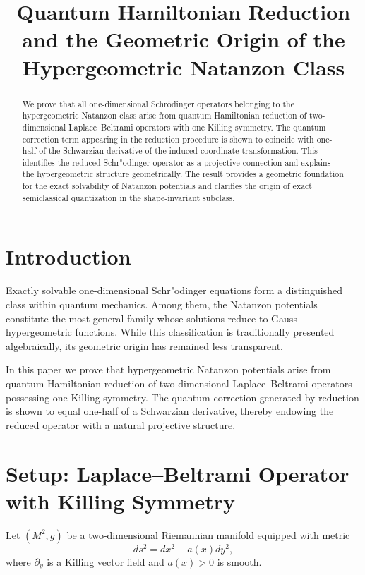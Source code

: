 \documentclass[11pt]{article}
\title{ Quantum Hamiltonian Reduction and the Geometric Origin of the Hypergeometric Natanzon Class}
\author{ }
\date{}
\begin{document}
\maketitle

\begin{abstract}
We prove that all one-dimensional Schr\"odinger operators belonging to the hypergeometric Natanzon class arise from quantum Hamiltonian reduction of two-dimensional Laplace--Beltrami operators with one Killing symmetry. The quantum correction term appearing in the reduction procedure is shown to coincide with one-half of the Schwarzian derivative of the induced coordinate transformation. This identifies the reduced Schr"odinger operator as a projective connection and explains the hypergeometric structure geometrically. The result provides a geometric foundation for the exact solvability of Natanzon potentials and clarifies the origin of exact semiclassical quantization in the shape-invariant subclass.
\end{abstract}

\section{Introduction}

Exactly solvable one-dimensional Schr"odinger equations form a distinguished class within quantum mechanics. Among them, the Natanzon potentials constitute the most general family whose solutions reduce to Gauss hypergeometric functions. While this classification is traditionally presented algebraically, its geometric origin has remained less transparent.

In this paper we prove that hypergeometric Natanzon potentials arise from quantum Hamiltonian reduction of two-dimensional Laplace--Beltrami operators possessing one Killing symmetry. The quantum correction generated by reduction is shown to equal one-half of a Schwarzian derivative, thereby endowing the reduced operator with a natural projective structure.

\section{Setup: Laplace--Beltrami Operator with Killing Symmetry}

Let $(M^2,g)$ be a two-dimensional Riemannian manifold equipped with metric
\begin{equation}
ds^2 = dx^2 + a(x) dy^2,
\end{equation}
where $\partial_y$ is a Killing vector field and $a(x)>0$ is smooth.
\end{document}
